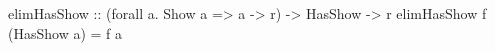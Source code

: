 \begin{code}
elimHasShow
    :: (forall a. Show a => a -> r)
    -> HasShow
    -> r
elimHasShow f (HasShow a) = f a
\end{code}
